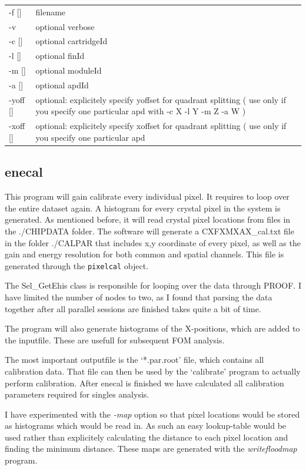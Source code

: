 \documentclass[12pt]{article}
\begin{document}
\begin{tabular}{ll}
 -f [] & filename\\
 -v & optional verbose\\
 -c []& optional cartridgeId\\
 -l []& optional finId \\
 -m []& optional moduleId\\ 
 -a []& optional apdId\\
 -yoff [] & optional: explicitely specify yoffset for quadrant splitting ( use only if you specify one particular apd with -c X -l Y -m Z -a W )\\
 -xoff [] & optional: explicitely specify xoffset for quadrant splitting ( use only if you specify one particular apd\\
\end{tabular}

\subsection{enecal}
This program will gain calibrate every individual pixel. It requires to loop over the entire dataset again. A histogram for every crystal pixel in the system is generated. As mentioned before, it will read crystal pixel locations from files in the ./CHIPDATA folder. The software will generate a  CXFXMXAX\_cal.txt file in the folder ./CALPAR that includes x,y coordinate of every pixel, as well as the gain and energy resolution for both common and spatial channels. This file is generated through the {\tt pixelcal} object. 

The Sel\_GetEhis class is responsible for looping over the data through PROOF. I have limited the number of nodes to two, as I found that parsing the data together after all parallel sessions are finished takes quite a bit of time. 

The program will also generate histograms of the X-positions, which are added to the inputfile. These are usefull for subsequent FOM analysis. 

The most important outputfile is the `*.par.root' file, which contains all calibration data. That file can then be used by the `calibrate' program to actually perform calibration. After enecal is finished we have calculated all calibration parameters required for singles analysis.

I have experimented with the {\em -map} option so that pixel locations would be stored as histograms which would be read in. As such an easy lookup-table would be used rather than explicitely calculating the distance to each pixel location and finding the minimum distance. These maps are generated with the {\em writefloodmap} program.
\end{document}
